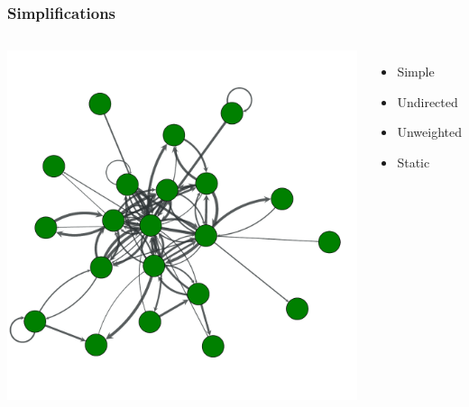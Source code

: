 \documentclass{beamer}
\begin{document}
\begin{frame}
    \frametitle{Simplifications}
    \begin{columns}
            \centering
            \includegraphics[width=0.9\columnwidth]{weighted_directed_nonsimple2.pdf}
            \centering
            \begin{itemize}
            \setlength\itemsep{1em}
                \item{Simple}
                \item{Undirected}
                \item{Unweighted}
                \item{Static}
            \end{itemize}
    \end{columns}
\end{frame}
\end{document}
